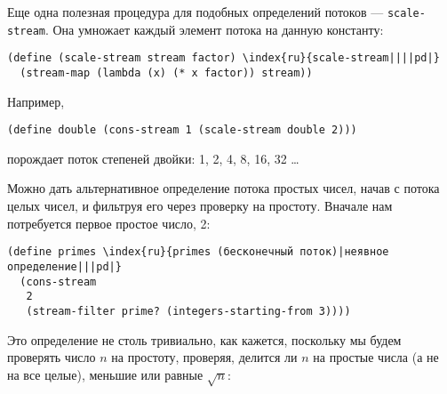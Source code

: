 Еще одна полезная процедура для подобных определений
потоков --- {\tt scale-stream}.  Она умножает каждый элемент
потока на данную константу:
{\sloppy

}
\begin{Verbatim}[fontsize=\small]
(define (scale-stream stream factor) \index{ru}{scale-stream||||pd|}
  (stream-map (lambda (x) (* x factor)) stream))
\end{Verbatim}
Например,

\begin{Verbatim}[fontsize=\small]
(define double (cons-stream 1 (scale-stream double 2)))
\end{Verbatim}
порождает поток степеней двойки: 1, 2, 4, 8, 16, 32 \ldots

Можно дать альтернативное определение потока простых
чисел, начав с потока целых чисел, и фильтруя его через проверку на
простоту.  Вначале нам потребуется первое простое число, 2:

\begin{Verbatim}[fontsize=\small]
(define primes \index{ru}{primes (бесконечный поток)|неявное определение|||pd|}
  (cons-stream
   2
   (stream-filter prime? (integers-starting-from 3))))
\end{Verbatim}

Это определение не столь тривиально, как кажется, поскольку мы будем
проверять число $n$ на простоту, проверяя, делится ли
$n$ на простые числа (а не на все целые), меньшие или
равные $\sqrt{n}$:

